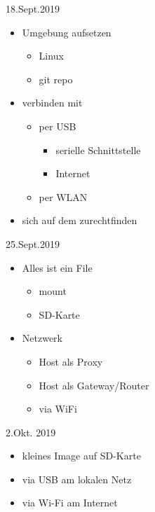 \documentclass{beamer}
\begin{document}
\begin{frame}{18.Sept.2019}
\begin{itemize}
 \item Umgebung aufsetzen
 \begin{itemize}
  \item Linux
  \item git repo
 \end{itemize}
\item \target verbinden mit \host
 \begin{itemize}
  \item per USB
  \begin{itemize}
   \item serielle Schnittstelle 
   \item Internet
  \end{itemize}
  \item per WLAN
 \end{itemize}
\item sich auf dem \target zurechtfinden
\end{itemize}
\end{frame}

\begin{frame}{25.Sept.2019}
 \begin{itemize}
  \item Alles ist ein File
  \begin{itemize}
   \item {} mount
   \item {} SD-Karte
  \end{itemize}
  \item Netzwerk
  \begin{itemize}
   \item Host als Proxy
   \item Host als Gateway/Router
   \item \targetS via WiFi
  \end{itemize}
 \end{itemize}
\end{frame}

\begin{frame}{2.Okt. 2019}
 \begin{itemize}
  \item \targetS kleines Image auf SD-Karte
  \item via USB am lokalen Netz
  \item via Wi-Fi am Internet
 \end{itemize}
\end{frame}
\end{document}
